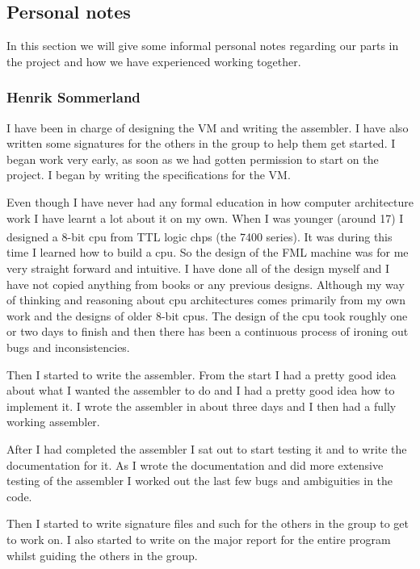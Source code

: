 \documentclass{article}
\begin{document}
\subsection{Personal notes}
In this section we will give some informal personal notes regarding our parts in
the project and how we have experienced working together.
\subsubsection{Henrik Sommerland}
I have been in charge of designing the VM and writing the assembler. I have also
written some signatures for the others in the group to help them get started. I
began work very early, as soon as we had gotten permission to start on the
project. I  began by writing the specifications for the VM.

Even though I have never had any formal education in how computer architecture
work I have learnt a lot about it on my own. When I was younger (around 17) I
designed a 8-bit cpu from TTL logic chps (the 7400
series\textsuperscript{\cite{7400}}). It was during this time I learned how to
build a cpu. So the design of the FML machine was for me very straight forward
and intuitive.
I have done all of the design myself and I have not
copied anything from books or any previous designs. Although my way of thinking
and reasoning about cpu architectures comes primarily from my own work and the
designs of older 8-bit cpus. The design of the cpu took roughly one or two days
to finish and then there has been a continuous process of ironing out bugs and
inconsistencies.

Then I started to write the assembler. From the start I had a pretty good idea
about what I wanted the assembler to do and I had a pretty good idea how to
implement it. I wrote the assembler in about three days and I then had a fully
working assembler.

After I had completed the assembler I sat out to start testing it and to write
the documentation for it. As I wrote the documentation and did more extensive
testing of the assembler I worked out the last few bugs and ambiguities in the
code.

Then I started to write signature files and such for the others in the group to
get to work on. I also started to write on the major report for the entire
program whilst guiding the others in the group.
\end{document}
